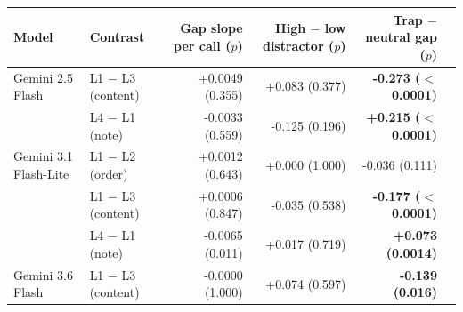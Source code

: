 \begin{tabular}{llrrrr}
\toprule
\textbf{Model} & \textbf{Contrast} & \textbf{Gap slope per call} ($p$) & \textbf{High $-$ low distractor} ($p$) & \textbf{Trap $-$ neutral gap} ($p$) \\
\midrule
Gemini 2.5 Flash & L1 $-$ L3 (content) & +0.0049 (0.355) & +0.083 (0.377) & \textbf{-0.273 ($<$0.0001)} \\
 & L4 $-$ L1 (note) & -0.0033 (0.559) & -0.125 (0.196) & \textbf{+0.215 ($<$0.0001)} \\
Gemini 3.1 Flash-Lite & L1 $-$ L2 (order) & +0.0012 (0.643) & +0.000 (1.000) & -0.036 (0.111) \\
 & L1 $-$ L3 (content) & +0.0006 (0.847) & -0.035 (0.538) & \textbf{-0.177 ($<$0.0001)} \\
 & L4 $-$ L1 (note) & -0.0065 (0.011) & +0.017 (0.719) & \textbf{+0.073 (0.0014)} \\
Gemini 3.6 Flash & L1 $-$ L3 (content) & -0.0000 (1.000) & +0.074 (0.597) & \textbf{-0.139 (0.016)} \\
\bottomrule
\end{tabular}
